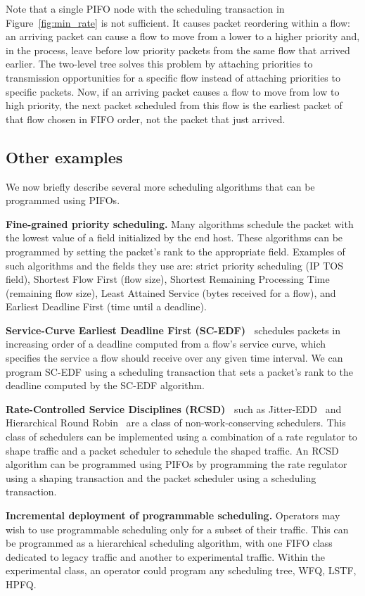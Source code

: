 Note that a single PIFO node with the scheduling transaction in
Figure~\ref{fig:min_rate} is not sufficient. It causes packet reordering within
a flow: an arriving packet can cause a flow to move from a lower to a higher
priority and, in the process, leave before low priority packets from the same
flow that arrived earlier. The two-level tree solves this problem by attaching
priorities to transmission opportunities for a specific flow instead of
attaching priorities to specific packets. Now, if an arriving packet causes a
flow to move from low to high priority, the next packet scheduled from this
flow is the earliest packet of that flow chosen in FIFO order, not the packet
that just arrived.

\subsection{Other examples}
\label{ss:other}

We now briefly describe several more scheduling algorithms that can be
programmed using PIFOs.

\begin{CompactEnumerate}
\item \textbf{Fine-grained priority scheduling.} Many algorithms schedule the
packet with the lowest value of a field initialized by the end host. These
algorithms can be programmed by setting the packet's rank to the appropriate
field. Examples of such algorithms and the fields they use are: strict priority
scheduling (IP TOS field), Shortest Flow First (flow size), Shortest Remaining
Processing Time (remaining flow size), Least Attained Service (bytes received
for a flow), and Earliest Deadline First (time until a deadline).
\item \textbf{Service-Curve Earliest Deadline First
    (SC-EDF)~\cite{sced}} schedules packets in increasing order of a
  deadline computed from a flow's service curve, which specifies the
  service a flow should receive over any given time interval. We can
  program SC-EDF using a scheduling transaction that sets a packet's
  rank to the deadline computed by the SC-EDF algorithm.
\item \textbf{Rate-Controlled Service Disciplines (RCSD)~\cite{rcsd}}
  such as Jitter-EDD~\cite{jitteredd} and Hierarchical Round
  Robin~\cite{hrr} are a class of non-work-conserving schedulers. This
  class of schedulers can be implemented using a combination of a rate
  regulator to shape traffic and a packet scheduler to schedule the
  shaped traffic. An RCSD algorithm can be programmed using PIFOs by
  programming the rate regulator using a shaping transaction and the
  packet scheduler using a scheduling transaction.
  
\item \textbf{Incremental deployment of programmable scheduling.}
  Operators may wish to use programmable scheduling only for a
  subset of their traffic. This can be programmed as a hierarchical
  scheduling algorithm, with one FIFO class dedicated to legacy
  traffic and another to experimental traffic. Within the experimental
  class, an operator could program any scheduling tree, \eg WFQ, LSTF, HPFQ.
\end{CompactEnumerate}

